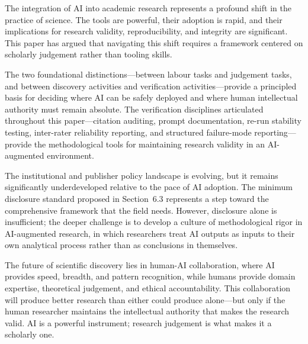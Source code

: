 \documentclass[12pt, a4paper]{article}
\begin{document}
The integration of AI into academic research represents a profound shift in the practice of science. The tools are powerful, their adoption is rapid, and their implications for research validity, reproducibility, and integrity are significant. This paper has argued that navigating this shift requires a framework centered on scholarly judgement rather than tooling skills.

The two foundational distinctions---between labour tasks and judgement tasks, and between discovery activities and verification activities---provide a principled basis for deciding where AI can be safely deployed and where human intellectual authority must remain absolute. The verification disciplines articulated throughout this paper---citation auditing, prompt documentation, re-run stability testing, inter-rater reliability reporting, and structured failure-mode reporting---provide the methodological tools for maintaining research validity in an AI-augmented environment.

The institutional and publisher policy landscape is evolving, but it remains significantly underdeveloped relative to the pace of AI adoption. The minimum disclosure standard proposed in Section~6.3 represents a step toward the comprehensive framework that the field needs. However, disclosure alone is insufficient; the deeper challenge is to develop a culture of methodological rigor in AI-augmented research, in which researchers treat AI outputs as inputs to their own analytical process rather than as conclusions in themselves.

The future of scientific discovery lies in human-AI collaboration, where AI provides speed, breadth, and pattern recognition, while humans provide domain expertise, theoretical judgement, and ethical accountability. This collaboration will produce better research than either could produce alone---but only if the human researcher maintains the intellectual authority that makes the research valid. AI is a powerful instrument; research judgement is what makes it a scholarly one.

\newpage


\end{document}
